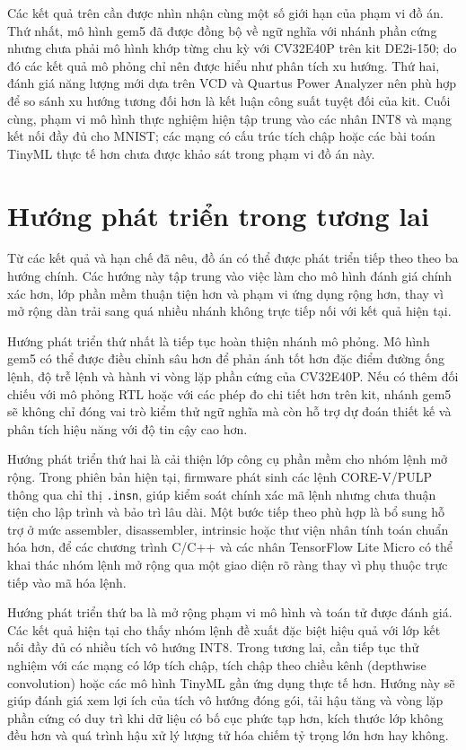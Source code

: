 \documentclass[../DoAn.tex]{subfiles}
\begin{document}
Các kết quả trên cần được nhìn nhận cùng một số giới hạn của phạm vi đồ án. Thứ
nhất, mô hình gem5 đã được đồng bộ về ngữ nghĩa với nhánh phần cứng nhưng chưa
phải mô hình khớp từng chu kỳ với CV32E40P trên kit DE2i-150; do đó các kết quả
mô phỏng chỉ nên được hiểu như phân tích xu hướng. Thứ hai, đánh giá năng lượng
mới dựa trên VCD và Quartus Power Analyzer nên phù hợp để so sánh xu hướng tương
đối hơn là kết luận công suất tuyệt đối của kit. Cuối cùng, phạm vi mô hình thực
nghiệm hiện tập trung vào các nhân INT8 và mạng kết nối đầy đủ cho MNIST; các
mạng có cấu trúc tích chập hoặc các bài toán TinyML thực tế hơn chưa được khảo
sát trong phạm vi đồ án này.

\section{Hướng phát triển trong tương lai}

Từ các kết quả và hạn chế đã nêu, đồ án có thể được phát triển tiếp theo theo
ba hướng chính. Các hướng này tập trung vào việc làm cho mô hình đánh giá chính
xác hơn, lớp phần mềm thuận tiện hơn và phạm vi ứng dụng rộng hơn, thay vì mở
rộng dàn trải sang quá nhiều nhánh không trực tiếp nối với kết quả hiện tại.

Hướng phát triển thứ nhất là tiếp tục hoàn thiện nhánh mô phỏng. Mô hình gem5
có thể được điều chỉnh sâu hơn để phản ánh tốt hơn đặc điểm đường ống lệnh, độ
trễ lệnh và hành vi vòng lặp phần cứng của CV32E40P. Nếu có thêm đối chiếu với
mô phỏng RTL hoặc với các phép đo chi tiết hơn trên kit, nhánh gem5 sẽ không
chỉ đóng vai trò kiểm thử ngữ nghĩa mà còn hỗ trợ dự đoán thiết kế và phân tích
hiệu năng với độ tin cậy cao hơn.

Hướng phát triển thứ hai là cải thiện lớp công cụ phần mềm cho nhóm lệnh mở
rộng. Trong phiên bản hiện tại, firmware phát sinh các lệnh CORE-V/PULP thông
qua chỉ thị \texttt{.insn}, giúp kiểm soát chính xác mã lệnh nhưng chưa thuận
tiện cho lập trình và bảo trì lâu dài. Một bước tiếp theo phù hợp là bổ sung
hỗ trợ ở mức assembler, disassembler, intrinsic hoặc thư viện nhân tính toán chuẩn hóa
hơn, để các chương trình C/C++ và các nhân TensorFlow Lite Micro có thể khai
thác nhóm lệnh mở rộng qua một giao diện rõ ràng thay vì phụ thuộc trực tiếp
vào mã hóa lệnh.

Hướng phát triển thứ ba là mở rộng phạm vi mô hình và toán tử được đánh giá.
Các kết quả hiện tại cho thấy nhóm lệnh đề xuất đặc biệt hiệu quả với lớp
kết nối đầy đủ có nhiều tích vô hướng INT8. Trong tương lai, cần tiếp tục thử
nghiệm với các mạng có lớp tích chập, tích chập theo chiều kênh
(depthwise convolution) hoặc các mô hình TinyML gần ứng dụng thực tế hơn.
Hướng này sẽ giúp đánh giá xem lợi ích của tích vô hướng đóng gói, tải hậu
tăng và vòng lặp phần cứng có duy trì khi dữ liệu có bố cục phức tạp hơn, kích
thước lớp không đều hơn và quá trình hậu xử lý lượng tử hóa chiếm tỷ trọng lớn
hơn hay không.
\end{document}
